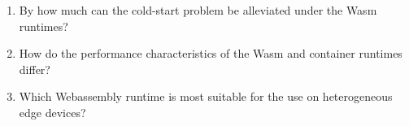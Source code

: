 \begin{enumerate}




  \item By how much can the cold-start problem be alleviated under the Wasm runtimes?

  \item How do the performance characteristics of the Wasm and container runtimes differ?

  \item Which Webassembly runtime is most suitable for the use on heterogeneous edge devices?



\end{enumerate}


